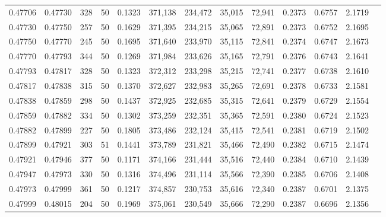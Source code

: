\begin{tabular}{rrrrrrrrrrrrr}
0.47706 & 0.47730 &   328 &  50 &                                     0.1323 & 371,138 & 234,472 &  35,015 &  72,941 & 0.2373 & 0.6757 & 2.1719 \\
0.47730 & 0.47750 &   257 &  50 &                                     0.1629 & 371,395 & 234,215 &  35,065 &  72,891 & 0.2373 & 0.6752 & 2.1695 \\
0.47750 & 0.47770 &   245 &  50 &                                     0.1695 & 371,640 & 233,970 &  35,115 &  72,841 & 0.2374 & 0.6747 & 2.1673 \\
0.47770 & 0.47793 &   344 &  50 &                                     0.1269 & 371,984 & 233,626 &  35,165 &  72,791 & 0.2376 & 0.6743 & 2.1641 \\
0.47793 & 0.47817 &   328 &  50 &                                     0.1323 & 372,312 & 233,298 &  35,215 &  72,741 & 0.2377 & 0.6738 & 2.1610 \\
0.47817 & 0.47838 &   315 &  50 &                                     0.1370 & 372,627 & 232,983 &  35,265 &  72,691 & 0.2378 & 0.6733 & 2.1581 \\
0.47838 & 0.47859 &   298 &  50 &                                     0.1437 & 372,925 & 232,685 &  35,315 &  72,641 & 0.2379 & 0.6729 & 2.1554 \\
0.47859 & 0.47882 &   334 &  50 &                                     0.1302 & 373,259 & 232,351 &  35,365 &  72,591 & 0.2380 & 0.6724 & 2.1523 \\
0.47882 & 0.47899 &   227 &  50 &                                     0.1805 & 373,486 & 232,124 &  35,415 &  72,541 & 0.2381 & 0.6719 & 2.1502 \\
0.47899 & 0.47921 &   303 &  51 &                                     0.1441 & 373,789 & 231,821 &  35,466 &  72,490 & 0.2382 & 0.6715 & 2.1474 \\
0.47921 & 0.47946 &   377 &  50 &                                     0.1171 & 374,166 & 231,444 &  35,516 &  72,440 & 0.2384 & 0.6710 & 2.1439 \\
0.47947 & 0.47973 &   330 &  50 &                                     0.1316 & 374,496 & 231,114 &  35,566 &  72,390 & 0.2385 & 0.6706 & 2.1408 \\
0.47973 & 0.47999 &   361 &  50 &                                     0.1217 & 374,857 & 230,753 &  35,616 &  72,340 & 0.2387 & 0.6701 & 2.1375 \\
0.47999 & 0.48015 &   204 &  50 &                                     0.1969 & 375,061 & 230,549 &  35,666 &  72,290 & 0.2387 & 0.6696 & 2.1356 \\

\end{tabular}
